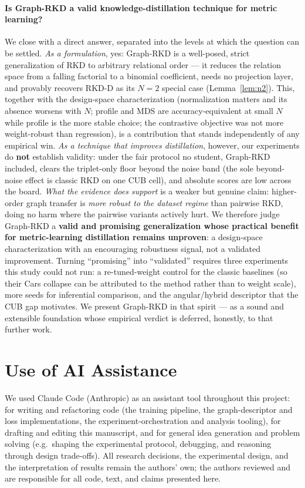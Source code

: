 \documentclass[11pt,letterpaper]{article}
\begin{document}
\paragraph{Is Graph-RKD a valid knowledge-distillation technique for metric learning?}
We close with a direct answer, separated into the levels at which the question can be
settled. \emph{As a formulation}, yes: Graph-RKD is a well-posed, strict generalization of
RKD to arbitrary relational order --- it reduces the relation space from a falling
factorial to a binomial coefficient, needs no projection layer, and provably recovers
RKD-D as its $N{=}2$ special case (Lemma~\ref{lem:n2}). This, together with the
design-space characterization (normalization matters and its absence worsens with $N$;
profile and MDS are accuracy-equivalent at small $N$ while profile is the more stable
choice; the contrastive objective was not more weight-robust than regression), is a
contribution that stands independently of any empirical win. \emph{As a technique that
improves distillation}, however, our experiments do \textbf{not} establish validity:
under the fair protocol no student, Graph-RKD included, clears the triplet-only floor
beyond the noise band (the sole beyond-noise effect is classic RKD on one CUB cell), and
absolute scores are low across the board. \emph{What the evidence does support} is a
weaker but genuine claim: higher-order graph transfer is \emph{more robust to the dataset
regime} than pairwise RKD, doing no harm where the pairwise variants actively hurt. We therefore judge Graph-RKD a \textbf{valid and promising generalization whose
practical benefit for metric-learning distillation remains unproven}: a design-space
characterization with an encouraging robustness signal, not a validated improvement.
Turning ``promising'' into ``validated'' requires three experiments this study could not
run: a re-tuned-weight control for the classic baselines (so their Cars collapse can be
attributed to the method rather than to weight scale), more seeds for inferential
comparison, and the angular/hybrid descriptor that the CUB gap motivates. We present
Graph-RKD in that spirit --- as a sound and extensible foundation whose empirical
verdict is deferred, honestly, to that further work.

\section*{Use of AI Assistance}
\label{sec:ai-assistance}

We used Claude Code (Anthropic) as an assistant tool throughout this project: for
writing and refactoring code (the training pipeline, the graph-descriptor and loss
implementations, the experiment-orchestration and analysis tooling), for drafting and
editing this manuscript, and for general idea generation and problem solving (e.g.\
shaping the experimental protocol, debugging, and reasoning through design trade-offs).
All research decisions, the experimental design, and the interpretation of results
remain the authors' own; the authors reviewed and are responsible for all code,
text, and claims presented here.
\end{document}
